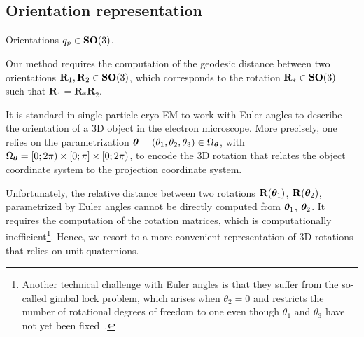 \subsection{Orientation representation}\label{sec:method:orientation-representation}

 

Orientations $q_p \in \mathrm{\mathbf{SO}}(3)$.
 

Our method requires the computation of the geodesic distance between two orientations $\mathbf{R}_1, \mathbf{R}_2 \in \mathrm{\mathbf{SO}}(3)$, which corresponds to the rotation $\mathbf{R}_* \in \mathrm{\mathbf{SO}}(3)$ such that $\mathbf{R}_1 = \mathbf{R}_* \mathbf{R}_2$.

It is standard in single-particle cryo-EM to work with Euler angles to describe the orientation of a 3D object in the electron microscope.
More precisely, one relies on the parametrization ${\boldsymbol{\theta}}=(\theta_1,\theta_2,\theta_3)\in\Omega_{\boldsymbol{\theta}}$, with $\Omega_{\boldsymbol{\theta}}=[0;2\pi)\times [0;\pi] \times [0;2\pi)$, to encode the 3D rotation that relates the object coordinate system to the projection coordinate system.

Unfortunately, the relative distance between two rotations $\mathbf{R}({\boldsymbol{\theta}}_1)$, $\mathbf{R}({\boldsymbol{\theta}}_2)$, parametrized by Euler angles cannot be directly computed from ${\boldsymbol{\theta}}_1$, ${\boldsymbol{\theta}}_2$.
It requires the computation of the rotation matrices, which is computationally inefficient\footnote{Another technical challenge with Euler angles is that they suffer from the so-called gimbal lock problem, which arises when $\theta_2=0$ and restricts the number of rotational degrees of freedom to one even though $\theta_1$ and $\theta_3$ have not yet been fixed~\cite{koks2006explorations}.}.
Hence, we resort to a more convenient representation of 3D rotations that relies on unit quaternions.

